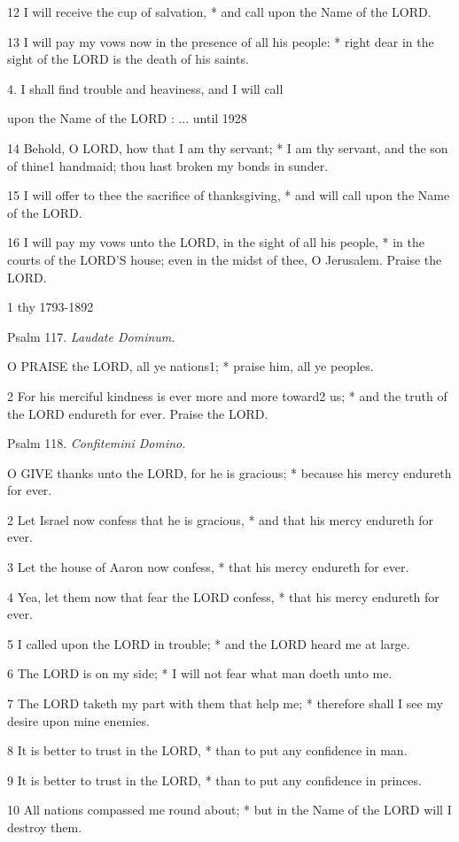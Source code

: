 12 I will receive the cup of salvation, * and call upon
the Name of the LORD.

13 I will pay my vows now in the presence of all his
people: * right dear in the sight of the LORD is the death of his saints.

4. I shall find trouble and
heaviness, and I will call

upon the Name of the LORD : ... until
1928

14 Behold, O LORD, how that I am thy servant; * I
am thy servant, and the son of thine1 handmaid; thou hast broken
my bonds in sunder.

15 I will offer to thee the sacrifice of thanksgiving,
* and will call upon the Name of the LORD.

16 I will pay my vows unto the LORD, in the sight of
all his people, * in the courts of the LORD’S house; even in the midst
of thee, O Jerusalem. Praise the LORD.

1 thy 1793-1892

Psalm
117. \emph{Laudate Dominum.}

O
PRAISE the LORD, all ye nations1; * praise him, all ye peoples.

2 For his merciful kindness is ever more and more toward2
us; * and the truth of the LORD endureth for ever. Praise the LORD.

Psalm
118. \emph{Confitemini Domino.}

O
GIVE thanks unto the LORD, for he is gracious; * because his mercy endureth
for ever.

2 Let Israel now confess that he is gracious, * and
that his mercy endureth for ever.

3 Let the house of Aaron now confess, * that his mercy
endureth for ever.

4 Yea, let them now that fear the LORD confess, * that
his mercy endureth for ever.

5 I called upon the LORD in trouble; * and the LORD
heard me at large.

6 The LORD is on my side; * I will not fear what man
doeth unto me.

7 The LORD taketh my part with them that help me; *
therefore shall I see my desire upon mine enemies.

8 It is better to trust in the LORD, * than to put
any confidence in man.

9 It is better to trust in the LORD, * than to put
any confidence in princes.

10 All nations compassed me round about; * but in the
Name of the LORD will I destroy them.

